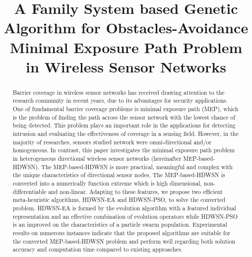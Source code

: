 \documentclass[final]{elsarticle}
\begin{document}
\begin{frontmatter}
\title{A Family System based Genetic Algorithm for  Obstacles-Avoidance Minimal Exposure Path Problem in Wireless Sensor Networks}

%
%
%
\begin{abstract}
Barrier coverage in wireless sensor networks has received drawing attention to the research community in recent years, due to its advantages for security applications. One of fundamental barrier coverage problems is minimal exposure path (MEP), which is the problem of finding the path across the sensor network with the lowest chance of being detected. This problem plays an important role in the applications for detecting intrusion and evaluating the effectiveness of coverage in a sensing field. However, in the majority of researches, sensors studied network were omni-directional and/or homogeneous. In contrast, this paper investigates the minimal exposure path problem in heterogeneous directional wireless sensor networks (hereinafter MEP-based-HDWSN). The MEP-based-HDWSN is more practical, meaningful and complex with the unique characteristics of directional sensor nodes. The MEP-based-HDWSN is converted into a numerically function extreme which is high dimensional, non-differentiable and non-linear. Adapting to these features, we propose two efficient meta-heuristic algorithms, HDWSN-EA and HDWSN-PSO, to solve the converted problem. HDWSN-EA is formed by the evolution algorithm with a featured individual representation and an effective combination of evolution operators while HDWSN-PSO is an improved on the characteristics of a particle swarm population. Experimental results on numerous instances indicate that the proposed algorithms are suitable for the converted MEP-based-HDWSN problem and perform well regarding both solution accuracy and computation time compared to existing approaches.
  

\end{abstract}
\end{frontmatter}
\end{document}
